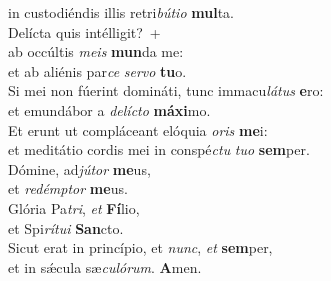 \evenverse in custodiéndis illis retri\textit{bú}\textit{ti}\textit{o} \textbf{mul}ta.\\
\oddverse Delícta quis intélligit?~+\\
\oddverse  ab occúltis \textit{me}\textit{is} \textbf{mun}da me:~\*\\
\oddverse et ab aliénis par\textit{ce} \textit{ser}\textit{vo} \textbf{tu}o.\\
\evenverse Si mei non fúerint domináti, tunc immacu\textit{lá}\textit{tus} \textbf{e}ro:~\*\\
\evenverse et emundábor a \textit{de}\textit{lí}\textit{cto} \textbf{má}\textbf{xi}mo.\\
\oddverse Et erunt ut compláceant elóquia \textit{o}\textit{ris} \textbf{me}i:~\*\\
\oddverse et meditátio cordis mei in conspé\textit{ctu} \textit{tu}\textit{o} \textbf{sem}per.\\
\evenverse Dómine, ad\textit{jú}\textit{tor} \textbf{me}us,~\*\\
\evenverse et \textit{re}\textit{dém}\textit{ptor} \textbf{me}us.\\
\oddverse Glória Pa\textit{tri}, \textit{et} \textbf{Fí}lio,~\*\\
\oddverse et Spi\textit{rí}\textit{tu}\textit{i} \textbf{San}cto.\\
\evenverse Sicut erat in princípio, et \textit{nunc}, \textit{et} \textbf{sem}per,~\*\\
\evenverse et in sǽcula sæ\textit{cu}\textit{ló}\textit{rum}. \textbf{A}men.\\
